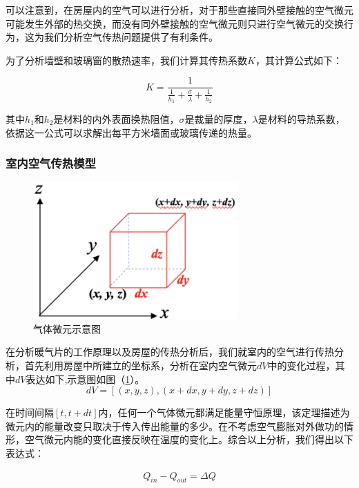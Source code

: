 \documentclass{my_paper}
\begin{document}
可以注意到，在房屋内的空气可以进行分析，对于那些直接同外壁接触的空气微元可能发生外部的热交换，而没有同外壁接触的空气微元则只进行空气微元的交换行为，这为我们分析空气传热问题提供了有利条件。

为了分析墙壁和玻璃窗的散热速率，我们计算其传热系数$K$\cite{1}，其计算公式如下：

\begin{equation}
    K = \frac{1}{\frac{1}{h_1}+\frac{\sigma}{\lambda}+\frac{1}{h_2}}
\end{equation}

其中$h_1$和$ h_2 $是材料的内外表面换热阻值，$ \sigma $是裁量的厚度，$ \lambda $是材料的导热系数，依据这一公式可以求解出每平方米墙面或玻璃传递的热量。
\subsubsection{室内空气传热模型}
\begin {figure}[h]
\centering %
\includegraphics[width=0.7\textwidth]{weiyuan.png}
\caption{气体微元示意图} %
\label{weiyuan}
\end {figure}
在分析暖气片的工作原理以及房屋的传热分析后，我们就室内的空气进行传热分析，首先利用房屋中所建立的坐标系，分析在室内空气微元$dV$中的变化过程，其中$dV$表达如下,示意图如图（\ref{weiyuan}）。
\begin{equation}
dV = [(x,y,z),(x+dx,y+dy,z+dz)]
\label{}
\end{equation}

在时间间隔$[t,t+dt]$内，任何一个气体微元都满足能量守恒原理，该定理描述为微元内的能量改变只取决于传入传出能量的多少。在不考虑空气膨胀对外做功的情形，空气微元内能的变化直接反映在温度的变化上。综合以上分析，我们得出以下表达式：

\begin{equation}
    \begin{aligned}
        Q_{in} - Q_{out} = \Delta Q\\
\end{aligned}
\label{mianq}
\end{equation}
\end{document}
